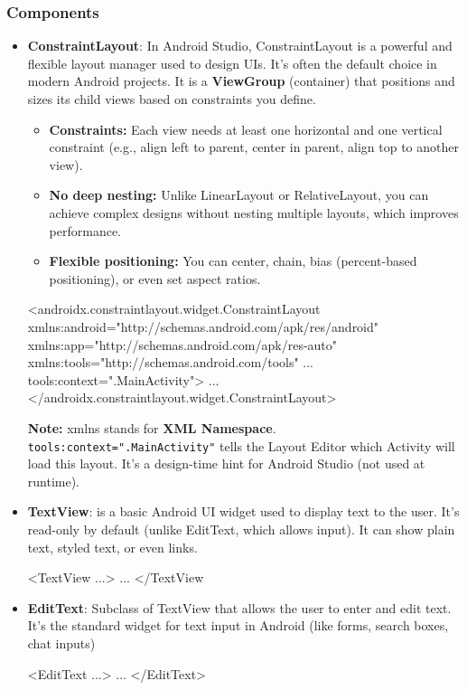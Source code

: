 \documentclass{report}
\begin{document}
    \pagebreak 
    \subsubsection{Components}
    \begin{itemize}
        \item \textbf{ConstraintLayout}: In Android Studio, ConstraintLayout is a powerful and flexible layout manager used to design UIs. It’s often the default choice in modern Android projects. 
            \bigbreak \noindent 
            It is a \textbf{ViewGroup} (container) that positions and sizes its child views based on constraints you define.
            \begin{itemize}
                \item \textbf{Constraints:} Each view needs at least one horizontal and one vertical constraint (e.g., align left to parent, center in parent, align top to another view).
                \item \textbf{No deep nesting:} Unlike LinearLayout or RelativeLayout, you can achieve complex designs without nesting multiple layouts, which improves performance.
                \item \textbf{Flexible positioning:} You can center, chain, bias (percent-based positioning), or even set aspect ratios.
            \end{itemize}
            \bigbreak \noindent 
            \begin{xmlcode}
            <androidx.constraintlayout.widget.ConstraintLayout 
            xmlns:android="http://schemas.android.com/apk/res/android" 
            xmlns:app="http://schemas.android.com/apk/res-auto"
            xmlns:tools="http://schemas.android.com/tools"
            ...
            tools:context=".MainActivity">
                ...
            </androidx.constraintlayout.widget.ConstraintLayout>
            \end{xmlcode}
            \bigbreak \noindent 
            \textbf{Note:} xmlns stands for \textbf{XML Namespace}. 
            \bigbreak \noindent 
            \texttt{tools:context=".MainActivity"} tells the Layout Editor which Activity will load this layout. It’s a design-time hint for Android Studio (not used at runtime).
        \item \textbf{TextView}: is a basic Android UI widget used to display text to the user. It’s read-only by default (unlike EditText, which allows input). It can show plain text, styled text, or even links.
            \bigbreak \noindent 
            \begin{xmlcode}
                <TextView ...>
                    ...
                </TextView
            \end{xmlcode}
        \item \textbf{EditText}: Subclass of TextView that allows the user to enter and edit text. It’s the standard widget for text input in Android (like forms, search boxes, chat inputs)
            \bigbreak \noindent 
            \begin{xmlcode}
                <EditText ...>
                    ...
                </EditText>
            \end{xmlcode}


\end{itemize}
\end{document}
